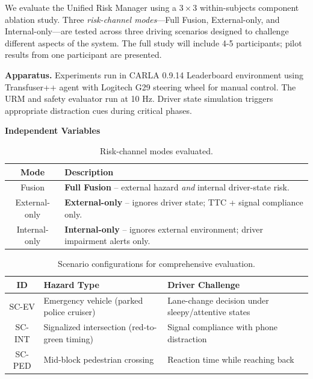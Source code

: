 We evaluate the Unified Risk Manager using a \(3 \times 3\) within-subjects 
component ablation study. Three \emph{risk-channel modes}—Full Fusion, 
External-only, and Internal-only—are tested across three driving scenarios 
designed to challenge different aspects of the system. The full study will 
include 4-5 participants; pilot results from one participant are presented.

\textbf{Apparatus.} Experiments run in CARLA 0.9.14 Leaderboard environment
using Transfuser++ agent with Logitech G29 steering wheel for manual control.
The URM and safety evaluator run at 10 Hz. Driver state simulation triggers
appropriate distraction cues during critical phases.

\vspace{0.5em}
\noindent\textbf{Independent Variables}

\begin{table}[H]
\centering
\footnotesize
\caption{Risk-channel modes evaluated.}
\label{tab:modes}
\begin{tabularx}{\columnwidth}{@{}cX@{}}
\toprule
\textbf{Mode} & \textbf{Description}\\ \midrule
Fusion & \textbf{Full Fusion} – external hazard \emph{and} internal driver-state risk.\\
External-only & \textbf{External-only} – ignores driver state; TTC + signal compliance only.\\
Internal-only & \textbf{Internal-only} – ignores external environment; driver impairment alerts only.\\
\bottomrule
\end{tabularx}
\end{table}

\begin{table}[H]
\centering
\footnotesize
\caption{Scenario configurations for comprehensive evaluation.}
\label{tab:scenarios}
\begin{tabularx}{\columnwidth}{@{}c p{2.2cm} X@{}}
\toprule
\textbf{ID} & \textbf{Hazard Type} & \textbf{Driver Challenge}\\ \midrule
SC-EV & Emergency vehicle (parked police cruiser) & Lane-change decision under sleepy/attentive states\\
SC-INT & Signalized intersection (red-to-green timing) & Signal compliance with phone distraction\\
SC-PED & Mid-block pedestrian crossing & Reaction time while reaching back\\
\bottomrule
\end{tabularx}
\end{table}

